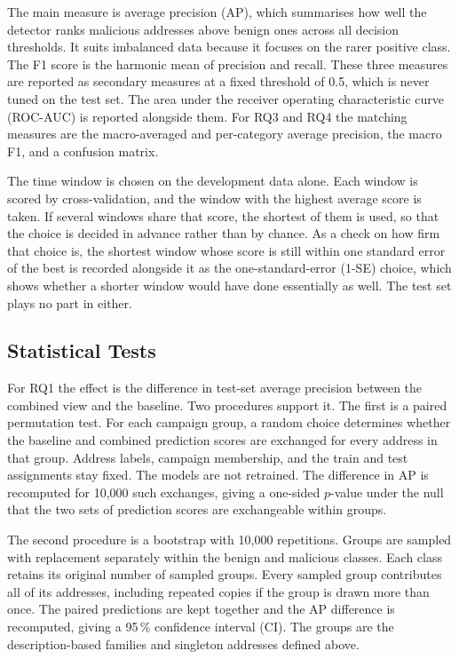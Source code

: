 \documentclass{thesisclass}
\begin{document}
The main measure is average precision (AP), which summarises how well the detector
ranks malicious addresses above benign ones across all decision thresholds. It
suits imbalanced data because it focuses on the rarer positive class. The F1
score is the harmonic mean of precision and recall. These three measures are
reported as secondary measures at a fixed threshold of
0.5, which is never tuned on the test set. The area under the receiver operating
characteristic curve (ROC-AUC) is reported alongside them.
For RQ3 and RQ4 the matching measures are the macro-averaged and per-category
average precision, the macro F1, and a confusion matrix.

The time window is chosen on the development data alone. Each window is scored by
cross-validation, and the window with the highest average score is taken. If
several windows share that score, the shortest of them is used, so that the choice
is decided in advance rather than by chance. As a check on how firm that choice is,
the shortest window whose score is still within one standard error of the best is
recorded alongside it as the one-standard-error (1-SE) choice, which shows whether a shorter window would have done
essentially as well. The test set plays no part in either.

\subsection{Statistical Tests}

For RQ1 the effect is the difference in test-set average precision between the
combined view and the baseline. Two procedures support it. The first is a
paired permutation test. For each campaign group, a random choice determines
whether the baseline and combined prediction scores are exchanged for every
address in that group. Address labels, campaign membership, and the train and
test assignments stay fixed. The models are not retrained. The difference in
AP is recomputed for 10{,}000 such exchanges, giving a one-sided $p$-value under
the null that the two sets of prediction scores are exchangeable within groups.

The second procedure is a bootstrap with 10{,}000 repetitions. Groups are
sampled with replacement separately within the benign and malicious classes.
Each class retains its original number of sampled groups. Every sampled group
contributes all of its addresses, including repeated copies if the group is
drawn more than once. The paired predictions are kept together and the AP
difference is recomputed, giving a 95\,\% confidence interval (CI).
The groups are the description-based families and singleton addresses defined
above.
\end{document}
